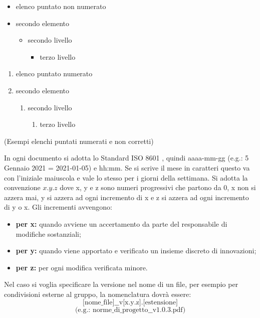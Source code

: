         \begin{multicols}{2}
            \begin{itemize}
                \item elenco puntato non numerato
                \item secondo elemento
                \begin{itemize}
                    \item secondo livello
                    \begin{itemize}
                        \item terzo livello
                    \end{itemize}
                \end{itemize}
            \end{itemize}
            \begin{enumerate}
                \item elenco puntato numerato
                \item secondo elemento
                \begin{enumerate}
                    \item secondo livello
                    \begin{enumerate}
                        \item terzo livello
                    \end{enumerate}
                \end{enumerate}
            \end{enumerate}
        \end{multicols}
        \centerline{(Esempi elenchi puntati numerati e non corretti)}
        In ogni documento si adotta lo Standard ISO 8601 , quindi aaaa-mm-gg (e.g.: 5 Gennaio 2021 = 2021-01-05) e hh:mm. Se si scrive il mese in caratteri questo va con l'iniziale maiuscola e vale lo stesso per i giorni della settimana.
        \label{versions}
        Si adotta la convenzione $x.y.z$ dove x, y e z sono numeri progressivi che partono da 0, x non si azzera mai, y si azzera ad ogni incremento di x e z si azzera ad ogni incremento di y o x. Gli incrementi avvengono:
        \begin{itemize}
            \item \textbf{per x: }quando avviene un accertamento da parte del responsabile di modifiche sostanziali;
            \item \textbf{per y: }quando viene apportato e verificato un insieme discreto di innovazioni;
            \item \textbf{per z: }per ogni modifica verificata minore.
        \end{itemize}
        Nel caso si voglia specificare la versione nel nome di un file, per esempio per condivisioni esterne al gruppo, la nomenclatura dovrà essere: $$\text{[nome\_file]\_\_v[x.y.z].[estensione]}$$ $$\text{(e.g.: norme\_di\_progetto\_\_v1.0.3.pdf)}$$

